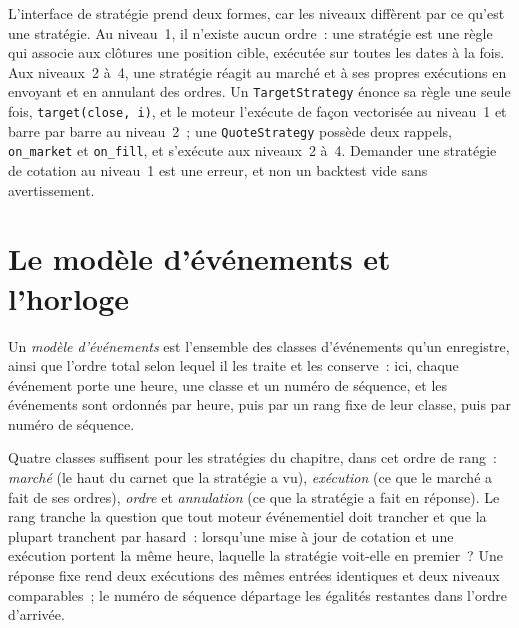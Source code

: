L'interface de stratégie prend deux formes, car les niveaux diffèrent par ce qu'est une stratégie. Au niveau~1, il n'existe aucun ordre~: une stratégie est une règle qui associe aux clôtures une position cible,
exécutée sur toutes les dates à la fois. Aux niveaux~2 à~4, une stratégie réagit au marché et à ses propres exécutions
en envoyant et en annulant des ordres. Un \texttt{TargetStrategy} énonce sa règle une seule fois, \texttt{target(close, i)}, et le moteur
l'exécute de façon vectorisée au niveau~1 et barre par barre au niveau~2~; une \texttt{QuoteStrategy} possède deux rappels, \texttt{on\_market} et \texttt{on\_fill},
et s'exécute aux niveaux~2 à~4. Demander une stratégie de cotation au niveau~1 est une erreur, et non un backtest vide sans avertissement.

\label{lst:pl:backtest-engine-architecture:quoter}

\label{lst:pl:backtest-engine-architecture:engine}

\section{Le modèle d'événements et l'horloge}

\begin{definition}\label{def:pl:backtest-engine-architecture:event}
Un \emph{modèle d'événements} est l'ensemble des classes d'événements qu'un  enregistre, ainsi que l'ordre total selon lequel il les traite et les conserve~:
ici, chaque événement porte une heure, une classe et un numéro de séquence, et les événements sont ordonnés par heure, puis par un rang fixe de leur classe,
puis par numéro de séquence.
\end{definition}

Quatre classes suffisent pour les stratégies du chapitre, dans cet ordre de rang~: \emph{marché} (le haut du carnet que la stratégie a vu), \emph{exécution}
(ce que le marché a fait de ses ordres), \emph{ordre} et \emph{annulation} (ce que la stratégie a fait en réponse). Le rang tranche la question
que tout moteur événementiel doit trancher et que la plupart tranchent par hasard~: lorsqu'une mise à jour de cotation et une exécution portent la même heure, laquelle la stratégie voit-elle en premier~?
Une réponse fixe rend deux exécutions des mêmes entrées identiques et deux niveaux comparables~; le numéro de séquence départage les égalités restantes
dans l'ordre d'arrivée.

